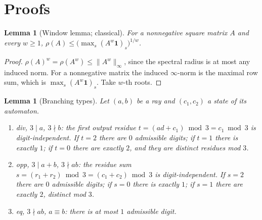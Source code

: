 \documentclass[11pt]{amsart}
\newtheorem{lemma}[theorem]{Lemma}
\theoremstyle{definition}
\theoremstyle{remark}
\begin{document}
\section{Proofs}
\label{sec:proofs}

\begin{lemma}[Window lemma; classical]
\label{lem:window}
For a nonnegative square matrix $A$ and every $w \ge 1$, $\rho(A) \le \bigl(\max_s (A^w \mathbf 1)_s\bigr)^{1/w}$.
\end{lemma}

\begin{proof}
$\rho(A)^w = \rho(A^w) \le \|A^w\|_\infty$, since the spectral radius is at most any induced norm. For a nonnegative matrix the induced $\infty$-norm is the maximal row sum, which is $\max_s (A^w \mathbf 1)_s$. Take $w$-th roots.
\end{proof}

\begin{lemma}[Branching types]
\label{lem:types}
Let $(a,b)$ be a ray and $(c_1,c_2)$ a state of its automaton.
\begin{enumerate}
  \item \emph{div}, $3 \mid a$, $3 \nmid b$: the first output residue $t = (ad+c_1) \bmod 3 = c_1 \bmod 3$ is digit-independent. If $t = 2$ there are $0$ admissible digits; if $t = 1$ there is exactly $1$; if $t = 0$ there are exactly $2$, and they are distinct residues mod $3$.
  \item \emph{opp}, $3 \mid a+b$, $3 \nmid ab$: the residue sum $s = (r_1 + r_2) \bmod 3 = (c_1+c_2) \bmod 3$ is digit-independent. If $s = 2$ there are $0$ admissible digits; if $s = 0$ there is exactly $1$; if $s = 1$ there are exactly $2$, distinct mod $3$.
  \item \emph{eq}, $3 \nmid ab$, $a \equiv b$: there is at most $1$ admissible digit.
\end{enumerate}
\end{lemma}
\end{document}
